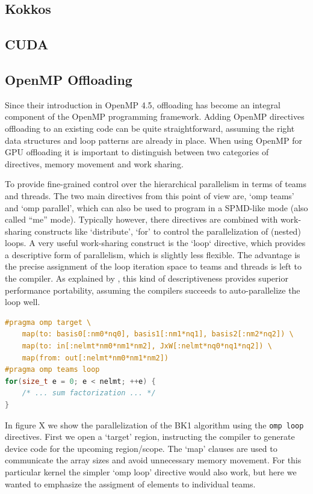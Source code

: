 \documentclass[a4paper,12pt]{article}
\begin{document}
\subsection{Kokkos}
\subsection{CUDA}
\subsection{OpenMP Offloading}

Since their introduction in OpenMP 4.5, offloading has become an integral component
of the OpenMP programming framework.
Adding OpenMP directives offloading to an existing code can be quite straightforward,
assuming the right data structures and loop patterns are already in place.
When using OpenMP for GPU offloading it is important to distinguish between two
categories of directives, memory movement and work sharing.

To provide fine-grained control over the hierarchical parallelism in terms of 
teams and threads. The two main directives from this point of view are, `omp teams' and `omp parallel', which can also be used to program in a SPMD-like mode (also called ``me'' mode). Typically however, there directives are combined with work-sharing
constructs like `distribute', `for' to control the parallelization of (nested) loops.
A very useful work-sharing construct is the `loop` directive, which provides 
a descriptive form of parallelism, which is slightly less flexible.
The advantage is the precise assignment of the loop iteration space to teams and threads is left to the compiler. 
As explained by \cite{Deakin23}, this kind of descriptiveness provides
superior performance portability, assuming the compilers succeeds to auto-parallelize
the loop well.

\begin{lstlisting}[language=C++,caption={Simple C++ hello world},label={lst:cpp-hello}]
#pragma omp target \
    map(to: basis0[:nm0*nq0], basis1[:nm1*nq1], basis2[:nm2*nq2]) \
    map(to: in[:nelmt*nm0*nm1*nm2], JxW[:nelmt*nq0*nq1*nq2]) \
    map(from: out[:nelmt*nm0*nm1*nm2])
#pragma omp teams loop
for(size_t e = 0; e < nelmt; ++e) {
    /* ... sum factorization ... */
}
\end{lstlisting}

In figure X we show the parallelization of the BK1 algorithm using the \texttt{omp loop} directives. First we open a `target' region, instructing the compiler to generate
device code for the upcoming region/scope. The `map' clauses are used to communicate the
array sizes and avoid unnecessary memory movement.
For this particular kernel the simpler `omp loop' directive would also work, but here we wanted
to emphasize the assigment of elements to individual teams.
\end{document}
